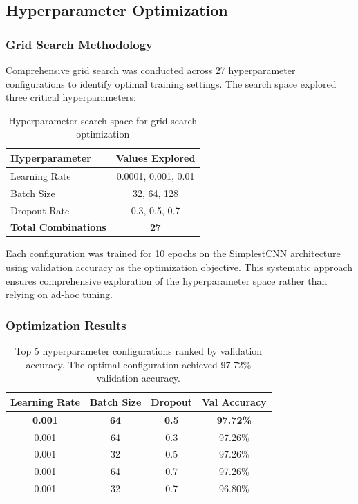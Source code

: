 \documentclass[12pt,a4paper]{article}
\begin{document}
\subsection{Hyperparameter Optimization}

\subsubsection{Grid Search Methodology}

Comprehensive grid search was conducted across 27 hyperparameter configurations to identify optimal training settings. The search space explored three critical hyperparameters:

\begin{table}[H]
\centering
\begin{tabular}{lc}
\toprule
\textbf{Hyperparameter} & \textbf{Values Explored} \\
\midrule
Learning Rate & 0.0001, 0.001, 0.01 \\
Batch Size & 32, 64, 128 \\
Dropout Rate & 0.3, 0.5, 0.7 \\
\midrule
\textbf{Total Combinations} & \textbf{27} \\
\bottomrule
\end{tabular}
\caption{Hyperparameter search space for grid search optimization}
\end{table}

Each configuration was trained for 10 epochs on the SimplestCNN architecture using validation accuracy as the optimization objective. This systematic approach ensures comprehensive exploration of the hyperparameter space rather than relying on ad-hoc tuning.

\subsubsection{Optimization Results}

\begin{table}[H]
\centering
\begin{tabular}{cccc}
\toprule
\textbf{Learning Rate} & \textbf{Batch Size} & \textbf{Dropout} & \textbf{Val Accuracy} \\
\midrule
\textbf{0.001} & \textbf{64} & \textbf{0.5} & \textbf{97.72\%} \\
0.001 & 64 & 0.3 & 97.26\% \\
0.001 & 32 & 0.5 & 97.26\% \\
0.001 & 64 & 0.7 & 97.26\% \\
0.001 & 32 & 0.7 & 96.80\% \\
\bottomrule
\end{tabular}
\caption{Top 5 hyperparameter configurations ranked by validation accuracy. The optimal configuration achieved 97.72\% validation accuracy.}
\end{table}
\end{document}
